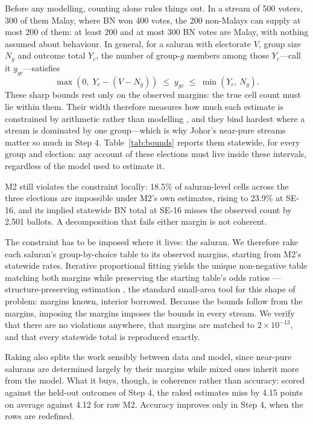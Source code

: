\documentclass[11pt]{article}
\begin{document}
Before any modelling, counting alone rules things out. In a stream of 500 voters, 300 of them Malay, where BN won 400 votes, the 200 non-Malays can supply at most 200 of them: at least 200 and at most 300 BN votes are Malay, with nothing assumed about behaviour. In general, for a saluran with electorate $V$, group size $N_g$ and outcome total $Y_c$, the number of group-$g$ members among those $Y_c$---call it $y_{gc}$---satisfies
\begin{equation}
	\max(0,\; Y_c - (V - N_g)) \;\le\; y_{gc} \;\le\; \min(Y_c,\, N_g).
	\label{eq:bounds}
\end{equation}
These sharp bounds \cite{duncandavis1953} rest only on the observed margins: the true cell count must lie within them. Their width therefore measures how much each estimate is constrained by arithmetic rather than modelling \cite{chogaines2004}, and they bind hardest where a stream is dominated by one group---which is why Johor's near-pure streams matter so much in Step 4. Table~\ref{tab:bounds} reports them statewide, for every group and election: any account of these elections must live inside these intervals, regardless of the model used to estimate it.



M2 still violates the constraint locally: 18.5\% of saluran-level cells across the three elections are impossible under M2's own estimates, rising to 23.9\% at SE-16, and its implied statewide BN total at SE-16 misses the observed count by 2,501 ballots. A decomposition that fails either margin is not coherent.

The constraint has to be imposed where it lives: the saluran. We therefore rake each saluran's group-by-choice table to its observed margins, starting from M2's statewide rates. Iterative proportional fitting yields the unique non-negative table matching both margins while preserving the starting table's odds ratios \cite{demingstephan1940,irelandkullback1968}---structure-preserving estimation \cite{purcellkish1980}, the standard small-area tool for this shape of problem: margins known, interior borrowed. Because the bounds follow from the margins, imposing the margins imposes the bounds in every stream. We verify that there are no violations anywhere, that margins are matched to $2\times10^{-13}$, and that every statewide total is reproduced exactly.

Raking also splits the work sensibly between data and model, since near-pure salurans are determined largely by their margins while mixed ones inherit more from the model. What it buys, though, is coherence rather than accuracy: scored against the held-out outcomes of Step 4, the raked estimates miss by 4.15 points on average against 4.12 for raw M2. Accuracy improves only in Step 4, when the rows are redefined.
\end{document}

